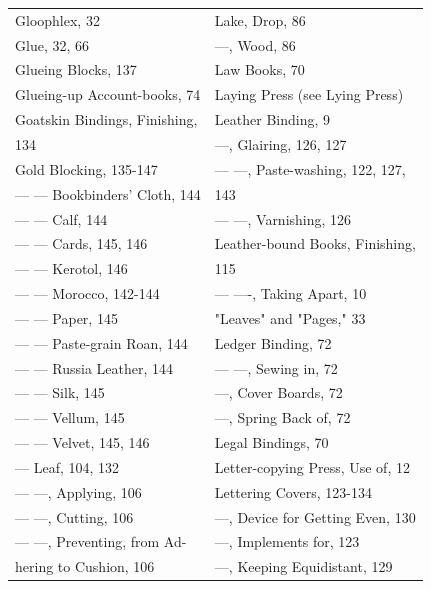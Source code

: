 \documentclass[twoside]{book}
\begin{document}
\begin{center}
\begin{tiny}
\begin{tabular}{l|l}
Gloophlex, 32                      & Lake, Drop, 86                     \\
Glue, 32, 66                       & ---, Wood, 86                      \\
Glueing Blocks, 137                & Law Books, 70                      \\
Glueing-up Account-books, 74       & Laying Press (see Lying Press)     \\
Goatskin Bindings, Finishing,      & Leather Binding, 9                 \\
    134                            & ---, Glairing, 126, 127            \\
Gold Blocking, 135-147             & --- ---, Paste-washing, 122, 127,  \\
--- --- Bookbinders' Cloth, 144    &     143                            \\
--- --- Calf, 144                  & --- ---, Varnishing, 126           \\
--- --- Cards, 145, 146            & Leather-bound Books, Finishing,    \\
--- --- Kerotol, 146               &     115                            \\
--- --- Morocco, 142-144           & --- ----, Taking Apart, 10         \\
--- --- Paper, 145                 & "Leaves" and "Pages," 33           \\
--- --- Paste-grain Roan, 144      & Ledger Binding, 72                 \\
--- --- Russia Leather, 144        & --- ---, Sewing in, 72             \\
--- --- Silk, 145                  & ---, Cover Boards, 72              \\
--- --- Vellum, 145                & ---, Spring Back of, 72            \\
--- --- Velvet, 145, 146           & Legal Bindings, 70                 \\
--- Leaf, 104, 132                 & Letter-copying Press, Use of, 12   \\
--- ---, Applying, 106             & Lettering Covers, 123-134          \\
--- ---, Cutting, 106              & ---, Device for Getting Even, 130  \\
--- ---, Preventing, from Ad-      & ---, Implements for, 123           \\
    hering to Cushion, 106         & ---, Keeping Equidistant, 129      \\

\end{tabular}
\end{tiny}
\end{center}
\end{document}
